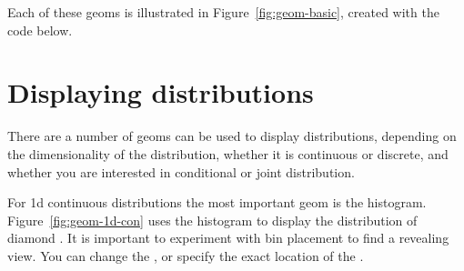 \noindent Each of these geoms is illustrated in Figure~\ref{fig:geom-basic}, created with the code below.

% 


\section{Displaying distributions}\label{sec:distributions}

There are a number of geoms can be used to display distributions, depending on the dimensionality of the distribution, whether it is continuous or discrete, and whether you are interested in conditional or joint distribution.

For 1d continuous distributions the most important geom is the histogram.  Figure~\ref{fig:geom-1d-con} uses the histogram to display the distribution of diamond .  It is important to experiment with bin placement to find a revealing view. You can change the , or specify the exact location of the .  

% 



